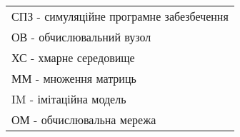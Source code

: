 
\begin{tabular}{l}
	\\
	СПЗ - симуляційне програмне забезбечення
	\\
	ОВ  - обчислювальний вузол
	\\
	ХС  - хмарне середовище
	\\
	ММ  - множення матриць
	\\
	IM  - імітаційна модель
	\\
	ОМ  - обчислювальна мережа
\end{tabular}